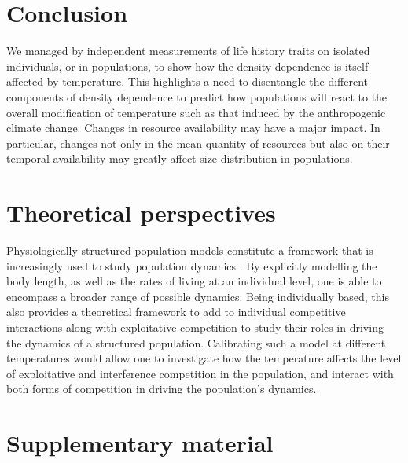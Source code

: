 \section{Conclusion}

We managed by independent measurements of life history traits on isolated
individuals, or in populations, to show how the density dependence is itself
affected by temperature. This highlights a need to disentangle the different
components of density dependence to predict how populations will react to the
overall modification of temperature such as that induced by the anthropogenic
climate change. Changes in resource availability may have a major impact. In
particular, changes not only in the mean quantity of resources but also on their
temporal availability may greatly affect size distribution in populations.

\section{Theoretical perspectives}

Physiologically structured population models \autocites{metz1986a,de-roos1992a} constitute a framework that is increasingly used to study
population dynamics \autocites{marty2011a,moenickes2011a}.
By explicitly modelling the body length, as well as the rates of living at an individual
level, one is able to encompass a broader range of possible dynamics. Being
individually based, this also provides a theoretical framework to add to
individual competitive interactions along with exploitative competition to study
their roles in driving the dynamics of a structured population. Calibrating such
a model at different temperatures would allow one to investigate how the
temperature affects the level of exploitative and interference competition in
the population, and interact with both forms of competition in driving the
population's dynamics.

















\newpage
\section{Supplementary material}

